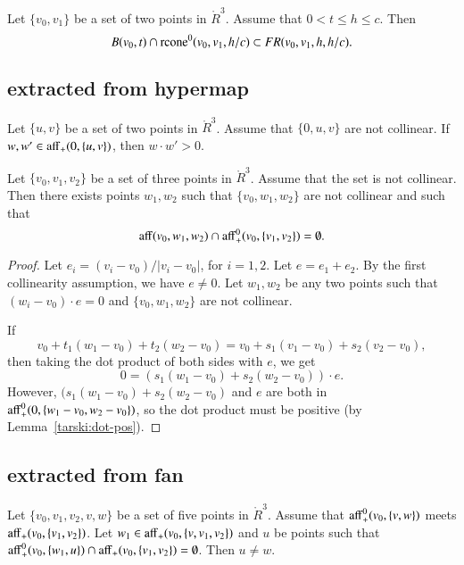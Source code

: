 \newpage

\begin{lemma}\label{tarski:RCFR}
Let $\{v_0,v_1\}$ be a set of two points in $\ring{R}^3$.
Assume that $0 < t \le h \le c$.  Then
$$
B(v_0,t) \cap {\operatorname{rcone}}^0(v_0,v_1,h/c) \subset
FR(v_0,v_1,h,h/c).
$$
\end{lemma}


\newpage

\subsection{extracted from hypermap}

\begin{lemma}\label{tarski:dot-pos}
Let $\{u,v\}$ be a set of two points in $\ring{R}^3$.
Assume that $\{0,u,v\}$ are not collinear.
If $w,w'\in{\operatorname{aff}}_+(0,\{u,v\})$, then
$w\cdot w' > 0$.
\end{lemma}

\begin{lemma}\label{tarski:miss-plane}
Let $\{v_0,v_1,v_2\}$ be a set of three points in $\ring{R}^3$.
Assume that the set is not collinear.  Then there exists points
$w_1,w_2$ such that $\{v_0,w_1,w_2\}$ are not collinear and such
that 
   $$
   {\operatorname{aff}}(v_0,w_1,w_2)\cap {\operatorname{aff}}_+^0(v_0,\{v_1,v_2\})=\emptyset.
   $$
\end{lemma}

\begin{proof}
Let $e_i = (v_i-v_0)/|v_i-v_0|$, for $i=1,2$. Let 
$e = e_1+e_2$.  By the first collinearity assumption, we have
$e\ne 0$.  Let $w_1,w_2$ be any two points such that
$(w_i-v_0)\cdot e = 0$ and $\{v_0,w_1,w_2\}$ are not collinear.

If 
 $$
 v_0 + t_1 (w_1-v_0) + t_2 (w_2-v_0)=v_0 + s_1 (v_1-v_0) + s_2 (v_2-v_0),
 $$
then taking the dot product of both sides with $e$, we get
$$
  0 = (s_1 (w_1-v_0) + s_2 (w_2-v_0))\cdot e.
$$
However, $(s_1 (w_1-v_0) + s_2 (w_2-v_0)$ and $e$ are both
in ${\operatorname{aff}}_+^0(0,\{w_1-v_0,w_2-v_0\})$, so the dot product
must be positive (by Lemma~\ref{tarski:dot-pos}).
\end{proof}

\newpage
\subsection{extracted from fan}

\begin{lemma}\label{tarski:subvertex}
Let $\{v_0,v_1,v_2,v,w\}$ be a set of five points in $\ring{R}^3$.
Assume that ${\operatorname{aff}}_+^0(v_0,\{v,w\})$ meets ${\operatorname{aff}}_+(v_0,\{v_1,v_2\})$.
Let $w_1\in {\operatorname{aff}}_+(v_0,\{v,v_1,v_2\})$ and $u$ be points such
that ${\operatorname{aff}}_+^0(v_0,\{w_1,u\})\cap {\operatorname{aff}}_+(v_0,\{v_1,v_2\})=\emptyset$.
Then $u\ne w$.
\end{lemma}


